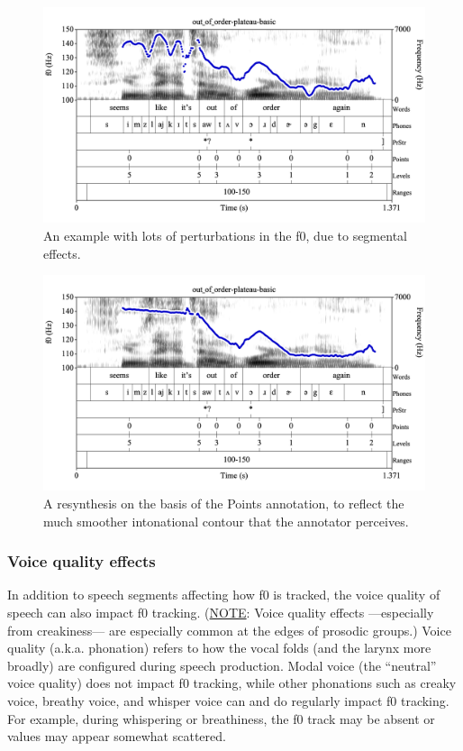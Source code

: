 \documentclass[11pt, twoside]{memoir}
\begin{document}
\begin{figure}[H]
\centering
%
\includegraphics[width=.875\linewidth]{Appendix-out_of_order-plateau}
%
\caption{An example with lots of perturbations in the f0, due to segmental effects.%
\label{fig:out of order-plateau f0-tracking}%
%
}
\end{figure}


\begin{figure}[H]
\centering
%
\includegraphics[width=.875\linewidth]{Appendix-out_of_order-plateau-resynth}
%
\caption{A resynthesis on the basis of the Points annotation, to reflect the much smoother intonational contour that the annotator perceives.%
\label{fig:out of order-plateau f0-tracking}%
}
\end{figure}


\subsubsection{Voice quality effects}\label{sec:voice-quality-effects}
In addition to speech segments affecting how f0 is tracked, the voice quality of speech can also impact f0 tracking. (\uline{NOTE}: Voice quality effects —especially from creakiness— are especially common at the edges of prosodic groups.) Voice quality (a.k.a. phonation) refers to how the vocal folds (and the larynx more broadly) are configured during speech production. Modal voice (the “neutral” voice quality) does not impact f0 tracking, while other phonations such as creaky voice, breathy voice, and whisper voice can and do regularly impact f0 tracking. For example, during whispering or breathiness, the f0 track may be absent or values may appear somewhat scattered. 
\end{document}
